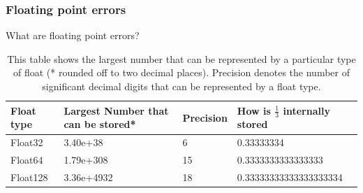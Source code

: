 \documentclass[hyperref={bookmarks=false},aspectratio=169]{beamer}
\begin{document}
\begin{frame}
  \frametitle{Floating point errors}
  What are floating point errors?
  \begin{table}[hbt!]
    \centering
    \begin{tabular}{||m{2cm} | m{3.0cm} | m{1.5cm} | m{4.5cm}||}
      \hline
      Float type & Largest Number that can be stored* & Precision & How is $\frac{1}{3}$ internally stored \\ [0.5ex]
      \hline\hline

      Float32    & 3.40e+38                           & 6         & 0.33333334                             \\

      Float64    & 1.79e+308                          & 15        & 0.3333333333333333                     \\

      Float128   & 3.36e+4932                         & 18        & 0.33333333333333333334                 \\ [1ex]
      \hline
    \end{tabular}
    \caption{This table shows the largest number that can be represented by a particular type of float (* rounded off to two decimal places). Precision denotes the number of significant decimal digits that can be represented by a float type.}
    \label{table:floats}
  \end{table}
\end{frame}
\end{document}
